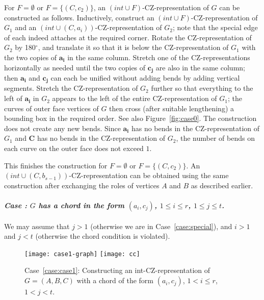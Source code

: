 \documentclass{article}
\renewcommand{\int}[1]{$(\mathit{int}\cup{#1})$}
\newcounter{thecase} \setcounter{thecase}{0}
\newcommand{\case}[1]{\noindent
            \refstepcounter{thecase}\paragraph*{\textnormal{\textit{Case \arabic{thecase}: #1}}}
}
\newcommand{\bb}[1]{\ensuremath{\mathbf{#1}}}
\begin{document}
For $F=\emptyset$ or $F=\{(C,c_2)\}$,
an \int{F}-CZ-representation of $G$ 
can be constructed as follows. Inductively, construct an 
\int{F}-CZ-representation of $G_1$ and an 
\int{(C,a_i)}-CZ-representation of $G_2$; note that the special edge
of each indeed attaches at the required corner. Rotate
the CZ-representation of $G_2$ by 180$^\circ$, and translate it
so that it is below the CZ-representation of $G_1$ with the two
copies of $\bb{a_i}$ in the same column.  Stretch one of the CZ-representations 
horizontally as needed until the two copies of $\bb{c_j}$ are also in
the same column; then $\bb{a_i}$ and $\bb{c_j}$ can each be unified without
adding bends by adding vertical segments.    Stretch the CZ-representation
of $G_2$ further so that everything to the left of $\bb{a_i}$ in $G_2$
appears to the left of the entire CZ-representation of $G_1$; the curves
of outer face vertices of $G$ then cross (after suitable lengthening)
a bounding box in the required order.  
See also Figure~\ref{fig:case0}.
The construction does not create any new bends. Since $\mathbf{a_i}$ has no bends in the CZ-representation of $G_1$ and $\bb{C}$ has
no bends in the CZ-representation of $G_2$, the number of bends on each curve on the outer face does not exceed $1$.

This finishes the construction for $F=\emptyset$ or $F=\{(C,c_2)\}$.  
An \int{(C,b_{s-1})}-CZ-representation can be obtained using the
same construction after exchanging the roles of vertices $A$ and $B$
as described earlier.

\case{$G$ has a chord in the form $(a_i,c_j)$, $1 \leq i \leq r$, $1 \leq j \leq t$.}
\label{case:case1}
We may assume that $j > 1$ (otherwise we are in Case~\ref{case:special}), 
and $i>1$ and $j<t$ (otherwise the chord condition is violated).


\begin{figure}
\centering
\texttt{[image: case1-graph]}\hspace{5em}
\texttt{[image: cc]}
\caption{Case~\ref{case:case1}: Constructing an int-CZ-representation of $G=(A,B,C)$ with a chord of 
the form $(a_i,c_j)$, $1 < i \leq r$, $1 < j < t$.}
\label{fig:case1-detail}
\end{figure}
\end{document}

